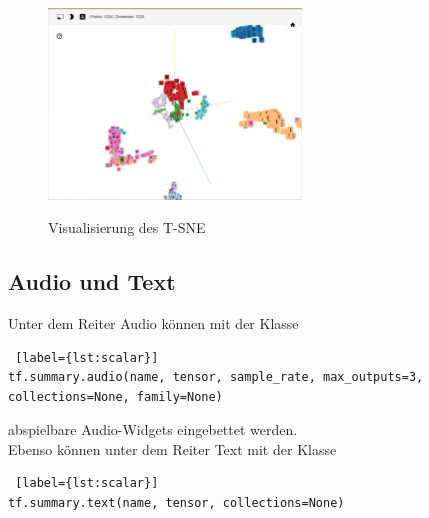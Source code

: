\begin{itemize}
\begin{figure}[h!]
	\centering
	 \includegraphics[width=0.6\textwidth]{images/Kapitel_3/projektor_t-sne.png}\\
	\vspace{10pt} 
	\caption[Visualisierung des T-SNE]{Visualisierung des T-SNE}
	\label{fig:t-sne}
\end{figure}

\end{itemize}


\subsection{Audio und Text}

Unter dem Reiter Audio können mit der Klasse
\\

\begin{minipage}{\linewidth}
\begin{lstlisting} [label={lst:scalar}]
tf.summary.audio(name, tensor, sample_rate, max_outputs=3, collections=None, family=None)
\end{lstlisting}
\end{minipage}
\vspace{0.2cm}

abspielbare Audio-Widgets eingebettet werden.\\

Ebenso können unter dem Reiter Text mit der Klasse
\\

\begin{minipage}{\linewidth}
\begin{lstlisting} [label={lst:scalar}]
tf.summary.text(name, tensor, collections=None)
\end{lstlisting}
\end{minipage}
\vspace{0.2cm}

